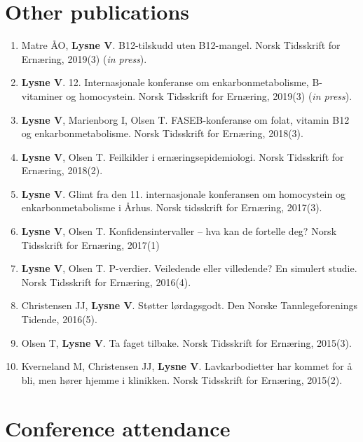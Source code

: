 \documentclass[11pt, a4paper]{awesome-cv}
\providecommand{\tightlist}{%
	\setlength{\itemsep}{0pt}\setlength{\parskip}{0pt}}
\begin{document}
\hypertarget{other-publications}{%
\section{Other publications}\label{other-publications}}

\begin{enumerate}
\def\labelenumi{\arabic{enumi}.}
\tightlist
\item
  Matre ÅO, \textbf{Lysne V}. B12-tilskudd uten B12-mangel. Norsk Tidsskrift for Ernæring, 2019(3) (\emph{in press}).
\item
  \textbf{Lysne V}. 12. Internasjonale konferanse om enkarbonmetabolisme, B-vitaminer og homocystein. Norsk Tidsskrift for Ernæring, 2019(3) (\emph{in press}).
\item
  \textbf{Lysne V}, Marienborg I, Olsen T. FASEB-konferanse om folat, vitamin B12 og enkarbonmetabolisme. Norsk Tidsskrift for Ernæring, 2018(3).
\item
  \textbf{Lysne V}, Olsen T. Feilkilder i ernæringsepidemiologi. Norsk Tidsskrift for Ernæring, 2018(2).
\item
  \textbf{Lysne V}. Glimt fra den 11. internasjonale konferansen om homocystein og enkarbonmetabolisme i Århus. Norsk tidsskrift for Ernæring, 2017(3).
\item
  \textbf{Lysne V}, Olsen T. Konfidensintervaller -- hva kan de fortelle deg? Norsk Tidsskrift for Ernæring, 2017(1)
\item
  \textbf{Lysne V}, Olsen T. P-verdier. Veiledende eller villedende? En simulert studie. Norsk Tidsskrift for Ernæring, 2016(4).
\item
  Christensen JJ, \textbf{Lysne V}. Støtter lørdagsgodt. Den Norske Tannlegeforenings Tidende, 2016(5).
\item
  Olsen T, \textbf{Lysne V}. Ta faget tilbake. Norsk Tidsskrift for Ernæring, 2015(3).
\item
  Kverneland M, Christensen JJ, \textbf{Lysne V}. Lavkarbodietter har kommet for å bli, men hører hjemme i klinikken. Norsk Tidsskrift for Ernæring, 2015(2).
\end{enumerate}

\newpage

\hypertarget{conference-attendance}{%
\section{Conference attendance}\label{conference-attendance}}
\end{document}
